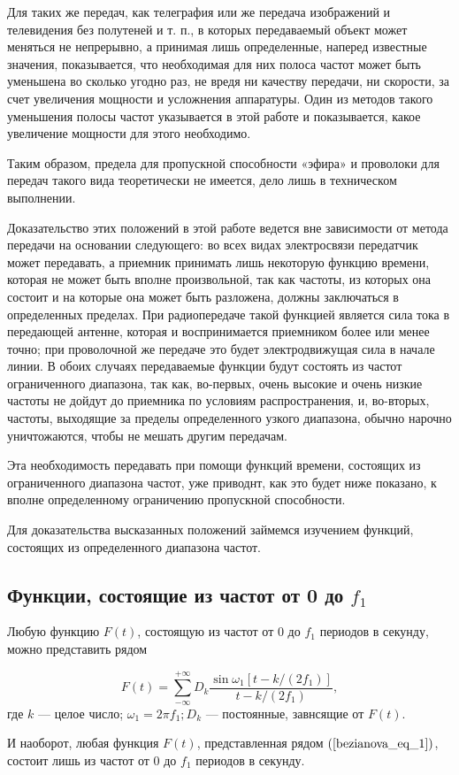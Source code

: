 Для таких же передач, как телеграфия или же передача изображений и телевидения без полутеней и т. п., в которых передаваемый объект может меняться не непрерывно, а принимая лишь определенные, наперед известные значения, показывается, что необходимая для них полоса частот может быть уменьшена во сколько угодно раз, не вредя ни качеству передачи, ни скорости, за счет увеличения мощности и усложнения аппаратуры. Один из методов такого уменьшения полосы частот указывается в этой работе и показывается, какое увеличение мощности для этого необходимо.

Таким образом, предела для пропускной способности «эфира» и проволоки для передач такого вида теоретически не имеется, дело лишь в техническом выполнении.

Доказательство этих положений в этой работе ведется вне зависимости от метода передачи на основании следующего: во всех видах электросвязи передатчик может передавать, а приемник принимать лишь некоторую функцию времени, которая не может быть вполне произвольной, так как частоты, из которых она состоит и на которые она может быть разложена, должны заключаться в определенных пределах. При радиопередаче такой функцией является сила тока в передающей антенне, которая и воспринимается приемником более или менее точно; при проволочной же передаче это будет электродвижущая сила в начале линии. В обоих случаях передаваемые функции будут состоять из частот ограниченного диапазона, так как, во-первых, очень высокие и очень низкие частоты не дойдут до приемника по условиям распространения, и, во-вторых, частоты, выходящие за пределы определенного узкого диапазона, обычно нарочно уничтожаются, чтобы не мешать другим передачам.

Эта необходимость передавать при помощи функций времени, состоящих из ограниченного диапазона частот, уже приводнт, как это будет ниже показано, к вполне определенному ограничению пропускной способности.

Для доказательства высказанных положений займемся изучением функций, состоящих из определенного диапазона частот.\newline

\subsection*{Функции, состоящие из частот от 0 до $f_1$} 

\begin{theorem}\label{bezianova_theor_1} Любую функцию $F(t)$, состоящую из частот от 0 до $f_1$ периодов в секунду, можно представить рядом

\begin{equation}\label{bezianova_eq_1}
    F(t)=\sum_{-\infty}^{+\infty} D_k \frac{\sin \omega_1\left[t-k /\left(2 f_1\right)\right]}{t-k/\left(2 f_1\right)}, 
\end{equation}
где $k$ --- целое число; $\omega_1 = 2 \pi f_1 ; D_k$ --- постоянные, завнсящие от $F(t)$.

И наоборот, любая функция $F(t)$, представленная рядом $(\ref{bezianova_eq_1})$, состоит лишь из частот от 0 до $f_1$ периодов в секунду.

\end{theorem}

